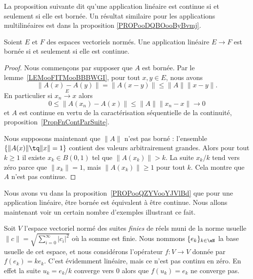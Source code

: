 La proposition suivante dit qu'une application linéaire est continue si et seulement si elle est bornée. Un résultat similaire pour les applications multilinéaires est dans la proposition \ref{PROPooDQBOooByBvmj}.

\begin{proposition}       \label{PROPooQZYVooYJVlBd}
	Soient \( E\) et \( F\) des espaces vectoriels normés. Une application linéaire \( E\to F\) est bornée si et seulement si elle est continue.
\end{proposition}

\begin{proof}
	Nous commençons par supposer que \( A\) est bornée. Par le lemme~\ref{LEMooFITMooBBBWGI}, pour tout \( x,y\in E\), nous avons
	\begin{equation}
		\| A(x)-A(y) \|=\| A(x-y) \|\leq \| A \|\| x-y \|.
	\end{equation}
	En particulier si \( x_n\stackrel{E}{\longrightarrow}x\) alors
	\begin{equation}
		0\leq \| A(x_n)-A(x) \|\leq \| A \|\| x_n-x \|\to 0
	\end{equation}
	et \( A\) est continue en vertu de la caractérisation séquentielle de la continuité, proposition~\ref{PropFnContParSuite}.

	Nous supposons maintenant que \( \| A \|\) n'est pas borné : l'ensemble \( \{ \| A(x) \|\tq \| x \|=1 \}\) contient des valeurs arbitrairement grandes. Alors pour tout \( k\geq 1\) il existe \( x_k\in B(0,1)\) tel que \( \| A(x_k) \|>k\). La suite \( x_k/k\) tend vers zéro parce que \( \| x_k \|=1\), mais \( \| A(x_k) \|\geq 1\) pour tout \( k\). Cela montre que \( A\) n'est pas continue.
\end{proof}


Nous avons vu dans la proposition~\ref{PROPooQZYVooYJVlBd} que pour une application linéaire, être bornée est équivalent à être continue. Nous allons maintenant voir un certain nombre d'exemples illustrant ce fait.

\begin{example}  \label{ExHKsIelG}
	Soit \( V\) l'espace vectoriel normé des suites \emph{finies} de réels muni de la norme usuelle \( \| c \|=\sqrt{\sum_{i=0}^{\infty}| c_i |^2}\) où la somme est finie. Nous nommons \( \{ e_k \}_{k\in \eN}\) la base usuelle de cet espace, et nous considérons l'opérateur \( f\colon V\to V\) donnée par \( f(e_k)=ke_k\). C'est évidemment linéaire, mais ce n'est pas continu en zéro. En effet la suite \( u_k=e_k/k\) converge vers \( 0\) alors que \( f(u_k)=e_k\) ne converge pas.
\end{example}


